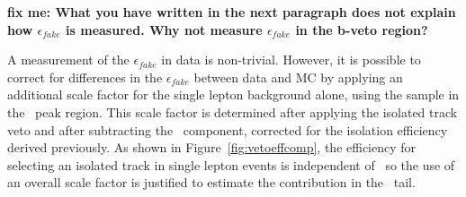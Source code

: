 

{\bf fix me: What you have written in the next paragraph does not explain how $\epsilon_{fake}$ is measured.
Why not measure $\epsilon_{fake}$ in the b-veto region?}

A measurement of the $\epsilon_{fake}$ in data is non-trivial. However, it is
possible to correct for differences in the $\epsilon_{fake}$ between data and MC by
applying an additional scale factor for the single lepton background
alone, using the sample in the \mt\ peak region. This scale factor is determined after applying the isolated track
veto and after subtracting the \ttll\ component, corrected for the
isolation efficiency derived previously. 
As shown in Figure~\ref{fig:vetoeffcomp}, the efficiency for selecting an
isolated track in single lepton events is independent of \mt\, so the use of
an overall scale factor is justified to estimate the contribution in
the \mt\ tail. 

